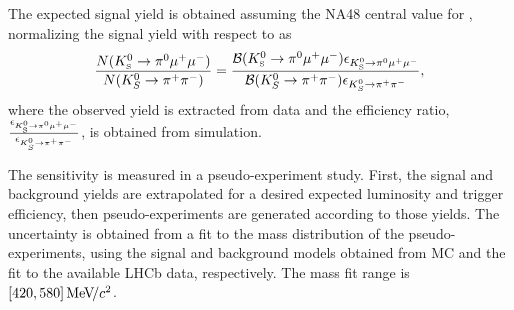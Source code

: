 
The expected signal yield is obtained assuming the NA48 central value for \BRof\Kspizmm, normalizing the signal yield with respect to \Kspipi as 
\begin{equation}
      \frac{N(K^0_{\mathrm{\scriptscriptstyle S}}\rightarrow\pi^{0}\mu^{+}\mu^{-})}{N(K^{0}_{S}\to\pi^{+}\pi^{-})} = 
      \frac{{\cal B}(K^0_{\mathrm{\scriptscriptstyle S}}\rightarrow\pi^{0}\mu^{+}\mu^{-}){\epsilon_{K^0_{\mathrm{\scriptscriptstyle S}}\rightarrow\pi^{0}\mu^{+}\mu^{-}}}}
      {{\cal B}(K^{0}_{S}\to\pi^{+}\pi^{-}){\epsilon_{K^{0}_{S}\to\pi^{+}\pi^{-}}}},
\label{eq:normalization}
\end{equation}
where the observed \Kspipi yield is extracted from data and the efficiency ratio, $\frac{\epsilon_{K^0_{\mathrm{\scriptscriptstyle S}}\rightarrow\pi^{0}\mu^{+}\mu^{-}}}{\epsilon_{K^{0}_{S}\to\pi^{+}\pi^{-}}}$, is obtained from simulation.

The \BRof\Kspizmm sensitivity is measured in a pseudo-experiment study. First, the signal and background yields are extrapolated
for a desired expected luminosity and trigger efficiency, then pseudo-experiments are generated according to those yields. 
The \BRof\Kspizmm uncertainty is obtained from a fit to the \KS mass distribution of the pseudo-experiments, using the signal and background
models obtained from MC and the fit to the available LHCb data, respectively. The mass fit range is $[420,580] {\mathrm{\,Me\kern -0.1em V\!/}c^2}$.
 


